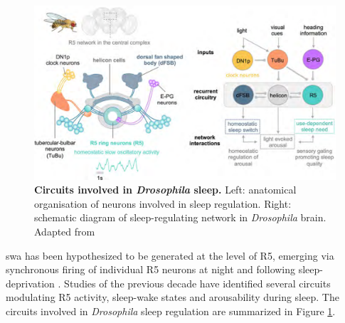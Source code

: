 \documentclass[../main.tex]{subfiles}
\begin{document}
\begin{figure}[!b]
    \centering
    \includegraphics[width=\linewidth]{../img/sleep_and_r5_network/sleep_circuit_suarez.png}
    \caption[Circuits involved in \textit{Drosophila} sleep]{
        \textbf{Circuits involved in \textit{Drosophila} sleep.}
        Left: anatomical organisation of neurons involved in sleep regulation. Right: schematic diagram of sleep-regulating network in \textit{Drosophila} brain.
        Adapted from \parencite{suarez-grimaltNeuralArchitectureSleep2021}
    }
    \label{fig:droso_sleep_circuit}
\end{figure}

\gls{swa} has been hypothesized to be generated at the level of R5, emerging via synchronous firing of individual R5 neurons at night and following sleep-deprivation \parencite{raccugliaNetworkSpecificSynchronizationElectrical2019}.
Studies of the previous decade have identified several circuits modulating R5 activity, sleep-wake states and arousability during sleep. The circuits involved in \textit{Drosophila} sleep regulation are summarized in Figure \ref{fig:droso_sleep_circuit}.
\end{document}
